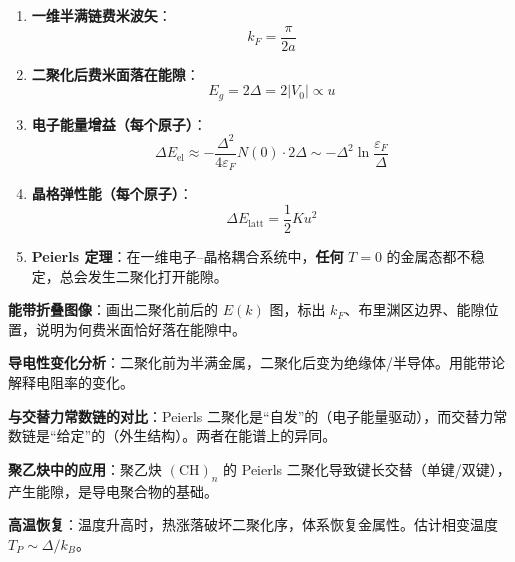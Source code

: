 \begin{formulabox}[核心公式]
\begin{enumerate}[label=\textbf{(\arabic*)}]
    \item \textbf{一维半满链费米波矢}：
    \[
    k_F=\frac{\pi}{2a}
    \]

    \item \textbf{二聚化后费米面落在能隙}：
    \[
    E_g=2\Delta=2|V_0|\propto u
    \]

    \item \textbf{电子能量增益（每个原子）}：
    \[
    \Delta E_{\text{el}}\approx-\frac{\Delta^2}{4\varepsilon_F}N(0)\cdot 2\Delta\sim-\Delta^2\ln\frac{\varepsilon_F}{\Delta}
    \]

    \item \textbf{晶格弹性能（每个原子）}：
    \[
    \Delta E_{\text{latt}}=\frac{1}{2}Ku^2
    \]

    \item \textbf{Peierls 定理}：在一维电子--晶格耦合系统中，\textbf{任何} $T=0$ 的金属态都不稳定，总会发生二聚化打开能隙。
\end{enumerate}
\end{formulabox}

\begin{drillbox}[训练点与考法变体]
 \textbf{能带折叠图像}：画出二聚化前后的 $E(k)$ 图，标出 $k_F$、布里渊区边界、能隙位置，说明为何费米面恰好落在能隙中。

 \textbf{导电性变化分析}：二聚化前为半满金属，二聚化后变为绝缘体/半导体。用能带论解释电阻率的变化。

 \textbf{与交替力常数链的对比}：Peierls 二聚化是``自发''的（电子能量驱动），而交替力常数链是``给定''的（外生结构）。两者在能谱上的异同。

 \textbf{聚乙炔中的应用}：聚乙炔 $(\text{CH})_n$ 的 Peierls 二聚化导致键长交替（单键/双键），产生能隙，是导电聚合物的基础。

 \textbf{高温恢复}：温度升高时，热涨落破坏二聚化序，体系恢复金属性。估计相变温度 $T_P\sim\Delta/k_B$。
\end{drillbox}

